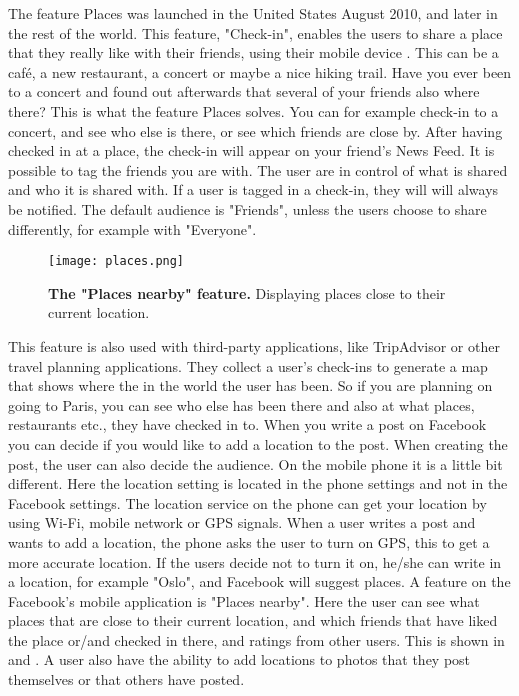 The feature Places was launched in the United States August 2010, and later in the rest of the world. This feature, "Check-in", enables the users to share a place that they really like with their friends, using their mobile device \cite{checkIn}. This can be a café, a new restaurant, a concert or maybe a nice hiking trail. Have you ever been to a concert and found out afterwards that several of your friends also where there? This is what the feature Places solves. You can for example check-in to a concert, and see who else is there, or see which friends are close by. After having checked in at a place, the check-in will appear on your friend's News Feed. It is possible to tag the friends you are with. The user are in control of what is shared and who it is shared with. If a user is tagged in a check-in, they will will always be notified. The default audience is "Friends", unless the users choose to share differently, for example with "Everyone".

\begin{figure}[t]
\centering
\texttt{[image: places.png]}
\caption [The "Places nearby" feature]{\textbf{The "Places nearby" feature.} Displaying places close to their current location.} 
\label{fig:places}
\end{figure}

This feature is also used with third-party applications, like TripAdvisor or other travel planning applications. They collect a user's check-ins to generate a map that shows where the in the world the user has been. So if you are planning on going to Paris, you can see who else has been there and also at what places, restaurants etc., they have checked in to. 
When you write a post on Facebook you can decide if you would like to add a location to the post. When creating the post, the user can also decide the audience. On the mobile phone it is a little bit different. Here the location setting is located in the phone settings and not in the Facebook settings. The location service on the phone can get your location by using Wi-Fi, mobile network or GPS signals. When a user writes a post and wants to add a location, the phone asks the user to turn on GPS, this to get a more accurate location. If the users decide not to turn it on, he/she can write in a location, for example "Oslo", and Facebook will suggest places. A feature on the Facebook's mobile application is "Places nearby". Here the user can see what places that are close to their current location, and which friends that have liked the place or/and checked in there, and ratings from other users. This is shown in  and . A user also have the ability to add locations to photos that they post themselves or that others have posted. 


